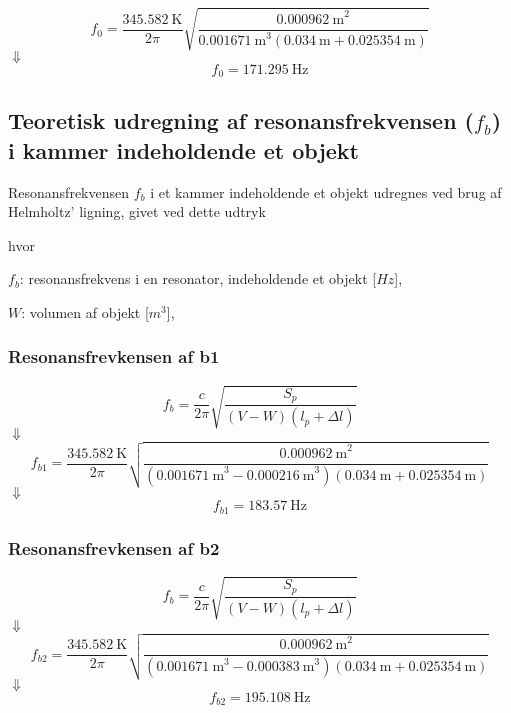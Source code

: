 \begin{equation}
		f_{0} = \frac{{\SI{345,582}{\kelvin}}}{2\pi}\sqrt{\frac{{\SI{0,000962}{\meter}^2}}{{\SI{0,001671}{\meter}^3}({\SI{0,034}{\meter}}+ {\SI{0.025354}{\meter}})}}
\end{equation}	
$\Downarrow$
\begin{equation}
		f_{0} = {\SI{171,295}{\hertz}}
		\end{equation}

\subsection{Teoretisk udregning af resonansfrekvensen ($f_{b}$) i kammer indeholdende et objekt}

Resonansfrekvensen $f_{b}$ i et kammer indeholdende et objekt udregnes ved brug af Helmholtz' ligning, givet ved dette udtryk \fb

hvor 
\begin{description}[align=left,labelindent=0.3cm]
\item $f_{b}$: resonansfrekvens i en resonator, indeholdende et objekt [$Hz$],\\
\item $W$: volumen af objekt [$m^3$],\\
\end{description}


\subsubsection{Resonansfrevkensen af b1} 
\hspace{1,5cm}
\begin{equation}
		f_{b} = \frac{c}{2\pi}\sqrt{\frac{S_{p}}{(V-W)(l_{p}+\Delta l)}}
	\end{equation}
$\Downarrow$
\begin{equation}
		f_{b1} = \frac{{\SI{345,582}{\kelvin}}}{2\pi}\sqrt{\frac{{\SI{0,000962}{\meter}^2}}{({\SI{0,001671}{\meter}^3}-{\SI{0,000216}{\meter}^3})({\SI{0,034}{\meter}}+ {\SI{0.025354}{\meter}})}}	
\end{equation}
$\Downarrow$
\begin{equation}
		f_{b1} = {\SI{183,57}{\hertz}}
\end{equation}

\subsubsection{Resonansfrevkensen af b2} 
\hspace{1,5cm}
\begin{equation}
		f_{b} = \frac{c}{2\pi}\sqrt{\frac{S_{p}}{(V-W)(l_{p}+\Delta l)}}
	\end{equation}
$\Downarrow$
\begin{equation}
		f_{b2} = \frac{{\SI{345,582}{\kelvin}}}{2\pi}\sqrt{\frac{{\SI{0,000962}{\meter}^2}}{({\SI{0,001671}{\meter}^3}-{\SI{0,000383}{\meter}^3})({\SI{0,034}{\meter}}+ {\SI{0.025354}{\meter}})}}	
\end{equation}
$\Downarrow$
\begin{equation}
		f_{b2} = {\SI{195,108}{\hertz}}
\end{equation}

